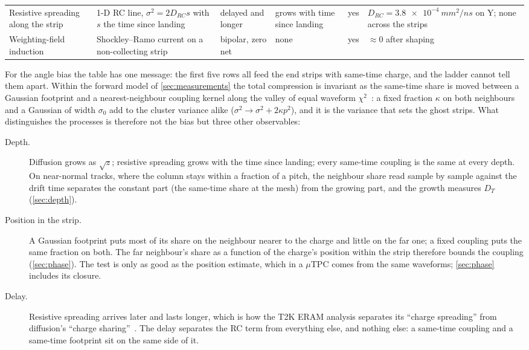 \begin{table}[t]
\begin{tabular}{@{}p{2.9cm}p{3.3cm}p{1.9cm}p{1.7cm}p{1.7cm}p{2.9cm}@{}}
    Resistive spreading along the strip & 1-D RC line, $\sigma^2 = 2 D_{RC} s$ with $s$ the time since landing & delayed and longer & grows with time since landing & yes & $D_{RC} = \SI{3.8e-4}{mm^2/ns}$ on Y; none across the strips \\
    Weighting-field induction & Shockley--Ramo current on a non-collecting strip & bipolar, zero net & none & yes & $\approx 0$ after shaping \\
    \bottomrule
  \end{tabular}
\end{table}

For the angle bias the table has one message: the first five rows all feed the end strips with same-time charge, and the
ladder cannot tell them apart. Within the forward model of \cref{sec:measurements} the total compression is invariant as the
same-time share is moved between a Gaussian footprint and a nearest-neighbour coupling kernel along the valley of equal
waveform $\chi^2$~\cite{paperII}: a fixed fraction $\kappa$ on both neighbours and a Gaussian of width $\sigma_0$ add to the cluster
variance alike ($\sigma^2 \to \sigma^2 + 2\kappa p^2$), and it is the variance that sets the ghost strips. What distinguishes the
processes is therefore not the bias but three other observables:

\begin{description}
\item[Depth.] Diffusion grows as $\sqrt{z}$; resistive spreading grows with the time since landing; every same-time coupling
  is the same at every depth. On near-normal tracks, where the column stays within a fraction of a pitch, the neighbour share
  read sample by sample against the drift time separates the constant part (the same-time share at the mesh) from the growing
  part, and the growth measures $D_T$ (\cref{sec:depth}).
\item[Position in the strip.] A Gaussian footprint puts most of its share on the neighbour nearer to the charge and little on
  the far one; a fixed coupling puts the same fraction on both. The far neighbour's share as a function of the charge's
  position within the strip therefore bounds the coupling (\cref{sec:phase}). The test is only as good as the position
  estimate, which in a $\mu$TPC comes from the same waveforms; \cref{sec:phase} includes its closure.
\item[Delay.] Resistive spreading arrives later and lasts longer, which is how the T2K ERAM analysis separates its ``charge
  spreading'' from diffusion's ``charge sharing''~\cite{T2K2022}. The delay separates the RC term from everything else, and
  nothing else: a same-time coupling and a same-time footprint sit on the same side of it.
\end{description}

